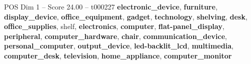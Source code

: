 \begin{textsample}{POS Dim 1 – Score 24.00 – t000227}  \label{ex:f1_pos_028}
\textbf{electronic\_device}, \textbf{furniture}, \textbf{display\_device}, \textbf{office\_equipment}, \textbf{gadget}, \textbf{technology}, \textbf{shelving}, \textbf{desk}, \textbf{office\_supplies}, shelf, \textbf{electronics}, \textbf{computer}, \textbf{flat-panel\_display}, \textbf{peripheral}, \textbf{computer\_hardware}, \textbf{chair}, \textbf{communication\_device}, \textbf{personal\_computer}, \textbf{output\_device}, \textbf{led-backlit\_lcd}, \textbf{multimedia}, \textbf{computer\_desk}, \textbf{television}, \textbf{home\_appliance}, \textbf{computer\_monitor}

\end{textsample}
